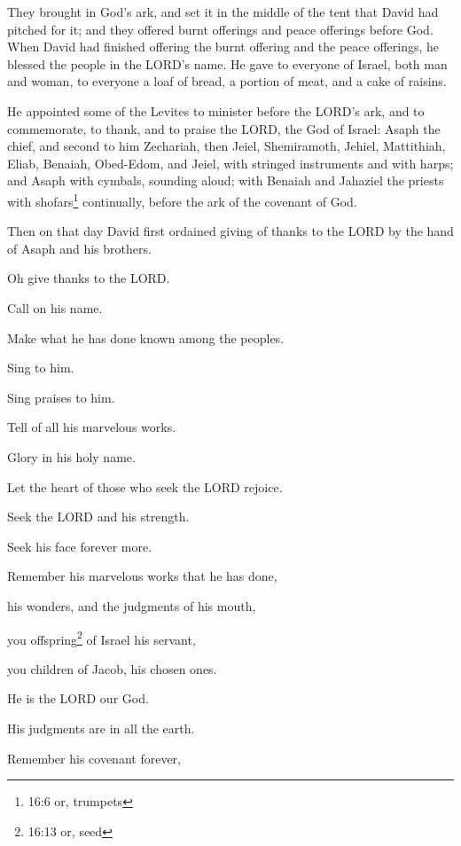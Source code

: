 \mychapter{} \myverse*{}They brought in God’s ark, and set it in the middle of the tent
that David had pitched for it; and they offered burnt offerings and peace offerings before God.
\myverse{}When David had finished offering the burnt offering and the peace offerings,
he blessed the people in the LORD’s name.
\myverse{}He gave to everyone of Israel, both man and woman, to everyone a loaf of bread,
a portion of meat, and a cake of raisins.

\myverse{}He appointed some of the Levites to minister before the LORD’s
ark, and to commemorate, to thank, and to praise the LORD, the God of Israel:
\myverse{}Asaph the chief, and second to him Zechariah, then Jeiel, Shemiramoth, Jehiel,
Mattithiah, Eliab, Benaiah, Obed-Edom, and Jeiel, with stringed instruments and with harps; and Asaph
with cymbals, sounding aloud;
\myverse{}with Benaiah and Jahaziel the priests with shofars\footnote{16:6 or, trumpets}
continually, before the ark of the covenant of God.

\myverse{}Then on that day David first ordained giving of thanks to the
LORD by the hand of Asaph and his brothers.

\myverse{}Oh give thanks to the LORD.

Call on his name.

Make what he has done known among the peoples.

\myverse{}Sing to him.

Sing praises to him.

Tell of all his marvelous works.

\myverse{}Glory in his holy name.

Let the heart of those who seek the LORD rejoice.

\myverse{}Seek the LORD and his strength.

Seek his face forever more.

\myverse{}Remember his marvelous works that he has done,

his wonders, and the judgments of his mouth,

\myverse{}you offspring\footnote{16:13 or, seed} of Israel his servant,

you children of Jacob, his chosen ones.


\vspace{\baselineskip} 

\myverse{}He is the LORD our God.

His judgments are in all the earth.

\myverse{}Remember his covenant forever,

